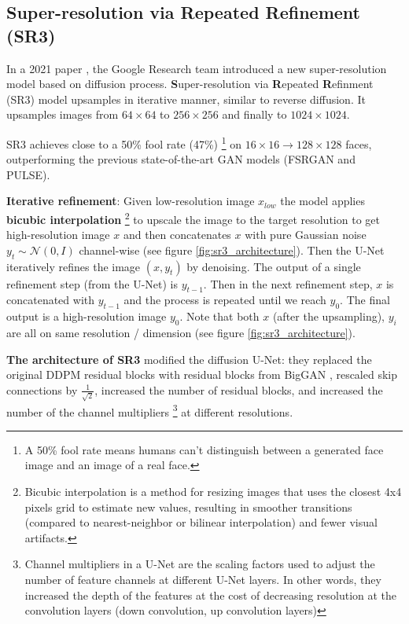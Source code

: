 \subsection{Super-resolution via Repeated Refinement (SR3)}

\label{subsec:imagen_sr3}

In a 2021 paper \cite{sr3}, the Google Research team introduced a new super-resolution model based on diffusion process. \textbf{S}uper-resolution via \textbf{R}epeated \textbf{R}efinment (SR3) model upsamples in iterative manner, similar to reverse diffusion. It upsamples images from $64\times 64$ to $256\times 256$ and finally to $1024\times 1024$.

SR3 achieves close to a 50\% fool rate (47\%) \footnote{A 50\% fool rate means humans can't distinguish between a generated face image and an image of a real face.} on $16\times 16 \rightarrow 128\times 128$ faces, outperforming the previous state-of-the-art GAN models (FSRGAN and PULSE).

\textbf{Iterative refinement}: Given low-resolution image $x_{low}$ the model applies \textbf{bicubic interpolation} \footnote{Bicubic interpolation is a method for resizing images that uses the closest 4x4 pixels grid to estimate new values, resulting in smoother transitions (compared to nearest-neighbor or bilinear interpolation) and fewer visual artifacts.} to upscale the image to the target resolution to get high-resolution image $x$ and then concatenates $x$ with pure Gaussian noise $y_t \sim \mathcal{N} (0, I)$ channel-wise (see figure \ref{fig:sr3_architecture}). Then the U-Net iteratively refines the image $(x, y_t)$ by denoising. The output of a single refinement step (from the U-Net) is $y_{t-1}$. Then in the next refinement step, $x$ is concatenated with $y_{t-1}$ and the process is repeated until we reach $y_0$. The final output is a high-resolution image $y_0$. Note that both $x$ (after the upsampling), $y_i$ are all on same resolution / dimension (see figure \ref{fig:sr3_architecture}).

\textbf{The architecture of SR3} modified the diffusion U-Net: they replaced the original DDPM residual blocks with residual blocks from BigGAN \cite{biggan_deep}, rescaled skip connections by $\frac{1}{\sqrt{2}}$, increased the number of residual blocks, and increased the number of the channel multipliers \footnote{Channel multipliers in a U-Net are the scaling factors used to adjust the number of feature channels at different U-Net layers. In other words, they increased the depth of the features at the cost of decreasing resolution at the convolution layers (down convolution, up convolution layers)} at different resolutions.

